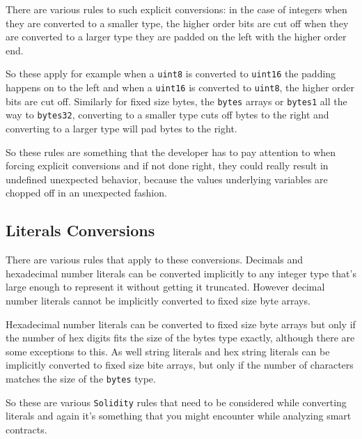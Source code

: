 There are various rules to such explicit conversions: in the case of
integers when they are converted to a smaller type, the higher order
bits are cut off when they are converted to a larger type they are
padded on the left with the higher order end.

So these apply for example when a \texttt{uint8} is converted to
\texttt{uint16} the padding happens on to the left and when a
\texttt{uint16} is converted to \texttt{uint8}, the higher order bits
are cut off. Similarly for fixed size bytes, the \texttt{bytes} arrays
or \texttt{bytes1} all the way to \texttt{bytes32}, converting to a
smaller type cuts off bytes to the right and converting to a larger type
will pad bytes to the right.

So these rules are something that the developer has to pay attention to
when forcing explicit conversions and if not done right, they could
really result in undefined unexpected behavior, because the values
underlying variables are chopped off in an unexpected fashion.

\subsection{Literals Conversions}\label{literals-conversions}

There are various rules that apply to these conversions. Decimals and
hexadecimal number literals can be converted implicitly to any integer
type that's large enough to represent it without getting it truncated.
However decimal number literals cannot be implicitly converted to fixed
size byte arrays.

Hexadecimal number literals can be converted to fixed size byte arrays
but only if the number of hex digits fits the size of the bytes type
exactly, although there are some exceptions to this. As well string
literals and hex string literals can be implicitly converted to fixed
size bite arrays, but only if the number of characters matches the size
of the \texttt{bytes} type.

So these are various \texttt{Solidity} rules that need to be considered
while converting literals and again it's something that you might
encounter while analyzing smart contracts.
